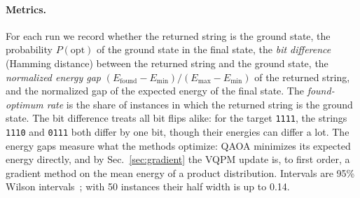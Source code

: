 \documentclass[onecolumn,10pt]{article}
\theoremstyle{remark}
\theoremstyle{plain}
\begin{document}
\paragraph{Metrics.} For each run we record whether the returned string is the ground state, the probability $P(\mathrm{opt})$ of the ground state in the final state, the \emph{bit difference} (Hamming distance) between the returned string and the ground state, the \emph{normalized energy gap} $(E_{\mathrm{found}}-E_{\min})/(E_{\max}-E_{\min})$ of the returned string, and the normalized gap of the expected energy of the final state. The \emph{found-optimum rate} is the share of instances in which the returned string is the ground state. The bit difference treats all bit flips alike: for the target \texttt{1111}, the strings \texttt{1110} and \texttt{0111} both differ by one bit, though their energies can differ a lot. The energy gaps measure what the methods optimize: QAOA minimizes its expected energy directly, and by Sec.~\ref{sec:gradient} the VQPM update is, to first order, a gradient method on the mean energy of a product distribution. Intervals are 95\% Wilson intervals~\cite{wilson1927probable}; with 50 instances their half width is up to 0.14.
\end{document}
